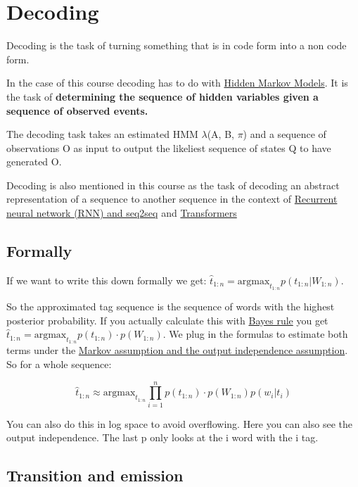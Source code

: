 \documentclass[
  11pt,
  british,
]{article}
\begin{document}
\hypertarget{decoding}{%
\section{Decoding}\label{decoding}}

Decoding is the task of turning something that is in code form into a
non code form.

In the case of this course decoding has to do with
\href{Hidden\%20Markov\%20Models.md}{Hidden Markov Models}. It is the
task of \textbf{determining the sequence of hidden variables given a
sequence of observed events.}

The decoding task takes an estimated HMM \(\lambda\)(A, B, \(\pi\)) and
a sequence of observations O as input to output the likeliest sequence
of states Q to have generated O.

Decoding is also mentioned in this course as the task of decoding an
abstract representation of a sequence to another sequence in the context
of \href{Recurrent\%20neural\%20network\%20(RNN).md}{Recurrent neural
network (RNN) and seq2seq} and \href{Transformers.md}{Transformers}

\hypertarget{formally}{%
\subsection{Formally}\label{formally}}

If we want to write this down formally we get:
\(\hat{t}_{1:n} =\text{argmax}_{t_{1:n}} p(t_{1:n}|W_{1:n})\).

So the approximated tag sequence is the sequence of words with the
highest posterior probability. If you actually calculate this with
\href{../Classification/Native\%20baiyes/Bayes\%20rule.md}{Bayes rule}
you get
\(\hat{t}_{1:n} =\text{argmax}_{t_{1:n}} p(t_{1:n}) \cdot p(W_{1:n})\).
We plug in the formulas to estimate both terms under the
\href{Hidden\%20Markov\%20Models.md}{Markov assumption and the output
independence assumption}. So for a whole sequence:

\[\hat{t}_{1:n} \approx \text{argmax}_{t_{1:n}} \prod^{n}_{i = 1} p(t_{1:n}) \cdot p(W_{1:n})p(w_{i}|t_{i})\]

You can also do this in log space to avoid overflowing. Here you can
also see the output independence. The last p only looks at the i word
with the i tag.

\hypertarget{transition-and-emission}{%
\subsection{Transition and emission}\label{transition-and-emission}}
\end{document}
